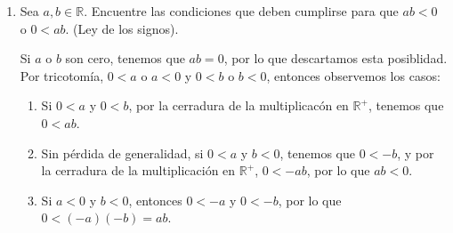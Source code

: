 \documentclass[11pt]{article}
\newcommand{\R}{\mathbb{R}}
\begin{document}
\begin{enumerate}[label=\alph*)]
    \item Sea $a,b\in \R$. Encuentre las condiciones que deben cumplirse para que $ab<0$ o $0<ab$. (Ley de los signos).
    
    Si $a$ o $b$ son cero, tenemos que $ab=0$, por lo que descartamos esta posiblidad. Por tricotomía, $0<a$ o $a<0$ y $0<b$ o $b<0$, entonces observemos los casos:
    \begin{enumerate}[label=\roman*)]
        \item Si $0<a$ y $0<b$, por la cerradura de la multiplicacón en $\R^+$, tenemos que $0<ab$.
        \item Sin pérdida de generalidad, si $0<a$ y $b<0$, tenemos que $0<-b$, y por la cerradura de la multiplicación en $\R^+$, $0<-ab$, por lo que $ab<0$.
        \item Si $a<0$ y $b<0$, entonces $0<-a$ y $0<-b$, por lo que $0<(-a)(-b)=ab$.
    \end{enumerate}


\end{enumerate}
\end{document}
